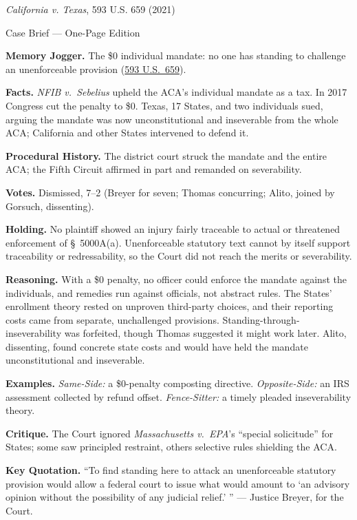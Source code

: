 \documentclass[12pt]{article}
\begin{document}
\begin{center}
{\Large \textit{California v. Texas}, 593 U.S. 659 (2021)\par}
\vspace{0.3em}
{\normalsize Case Brief --- One-Page Edition\par}
\end{center}

\textbf{Memory Jogger.} The \$0 individual mandate: no one has standing to challenge an unenforceable provision (\href{https://www.courtlistener.com/opinion/4892571/california-v-texas/}{593 U.S.\ 659}).

\textbf{Facts.} \textit{NFIB v.\ Sebelius} upheld the ACA's individual mandate as a tax. In 2017 Congress cut the penalty to \$0. Texas, 17 States, and two individuals sued, arguing the mandate was now unconstitutional and inseverable from the whole ACA; California and other States intervened to defend it.

\textbf{Procedural History.} The district court struck the mandate and the entire ACA; the Fifth Circuit affirmed in part and remanded on severability.

\textbf{Votes.} Dismissed, 7--2 (Breyer for seven; Thomas concurring; Alito, joined by Gorsuch, dissenting).

\textbf{Holding.} No plaintiff showed an injury fairly traceable to actual or threatened enforcement of \S\ 5000A(a). Unenforceable statutory text cannot by itself support traceability or redressability, so the Court did not reach the merits or severability.

\textbf{Reasoning.} With a \$0 penalty, no officer could enforce the mandate against the individuals, and remedies run against officials, not abstract rules. The States' enrollment theory rested on unproven third-party choices, and their reporting costs came from separate, unchallenged provisions. Standing-through-inseverability was forfeited, though Thomas suggested it might work later. Alito, dissenting, found concrete state costs and would have held the mandate unconstitutional and inseverable.

\textbf{Examples.} \emph{Same-Side:} a \$0-penalty composting directive. \emph{Opposite-Side:} an IRS assessment collected by refund offset. \emph{Fence-Sitter:} a timely pleaded inseverability theory.

\textbf{Critique.} The Court ignored \textit{Massachusetts v.\ EPA}'s ``special solicitude'' for States; some saw principled restraint, others selective rules shielding the ACA.

\textbf{Key Quotation.} ``To find standing here to attack an unenforceable statutory provision would allow a federal court to issue what would amount to `an advisory opinion without the possibility of any judicial relief.' '' --- Justice Breyer, for the Court.
\end{document}
